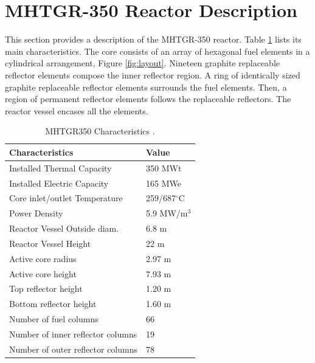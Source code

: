 \documentclass[11pt,letterpaper]{article}
\begin{document}
\section{\gls{MHTGR}-350 Reactor Description}

This section provides a description of the \gls{MHTGR}-350 reactor.
Table \ref{tab:maincharac} lists its main characteristics.
The core consists of an array of hexagonal fuel elements in a cylindrical arrangement, Figure \ref{fig:layout}.
Nineteen graphite replaceable reflector elements compose the inner reflector region.
A ring of identically sized graphite replaceable reflector elements surrounds the fuel elements.
Then, a region of permanent reflector elements follows the replaceable reflectors.
The reactor vessel encases all the elements.

\begin{table}[htbp!]
	\centering
    \caption{MHTGR350 Characteristics \cite{oecd_nea_benchmark_2017}.}
	\begin{tabular}{ll}
  \toprule
	Characteristics                   & Value               \\ \midrule
	Installed Thermal Capacity        & 350 MWt             \\
	Installed Electric Capacity       & 165 MWe             \\
	Core inlet/outlet Temperature     & 259/687$^{\circ}$C  \\
	Power Density                     & 5.9 MW/m$^3$        \\
  Reactor Vessel Outside diam.      & 6.8 m               \\
	Reactor Vessel Height             & 22 m                \\
	Active core radius                & 2.97 m              \\
	Active core height                & 7.93 m              \\
  Top reflector height              & 1.20 m              \\
  Bottom reflector height           & 1.60 m              \\
	Number of fuel columns            & 66                  \\
	Number of inner reflector columns & 19                  \\
	Number of outer reflector columns & 78                  \\
  \bottomrule
	\end{tabular}
  \label{tab:maincharac}
\end{table}
\end{document}
